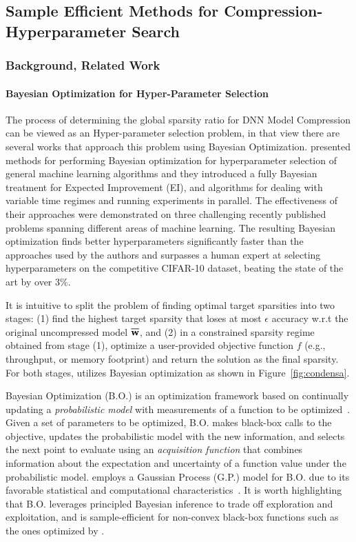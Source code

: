 \subsection{Sample Efficient Methods for Compression-Hyperparameter Search}
\subsubsection{Background, Related Work}

\paragraph{Bayesian Optimization for Hyper-Parameter Selection}
%
The process of determining the global sparsity ratio for DNN Model Compression can be viewed as an Hyper-parameter selection problem, in that view 
there are several works that approach this problem using Bayesian Optimization.
%
\cite{snoek2012practical} presented methods for performing Bayesian optimization for hyperparameter selection of general machine learning algorithms and they introduced a fully Bayesian treatment for Expected Improvement (EI), and algorithms for dealing with variable time regimes and running experiments in parallel. 
%
The effectiveness of their
approaches were demonstrated on three challenging recently published problems spanning different areas of machine learning. 
%
The resulting Bayesian optimization finds better hyperparameters significantly faster than the approaches \cite{cirecsan2012multi} used by the authors and surpasses a human expert at selecting hyperparameters on the competitive CIFAR-10 dataset, beating the state of the art by over $3\%$.

It is intuitive to split the problem of finding optimal target sparsities into two stages: (1) find the highest target sparsity that loses at most $\epsilon$ accuracy w.r.t the original uncompressed model $\overline{{\bf w}}$, and (2) in a constrained sparsity regime obtained from stage (1), optimize a user-provided objective function $f$ (e.g., throughput, or memory footprint) and return the solution as the final sparsity.
For both stages, \algoName utilizes Bayesian optimization as shown in Figure~\ref{fig:condensa}.

Bayesian Optimization (B.O.) is an optimization framework based on continually updating a {\em probabilistic model} with measurements of a function to be optimized~\cite{jones1998efficient}. Given a set of parameters to be optimized, B.O. makes black-box calls to the objective, updates the probabilistic model with the new information, and selects the next point to evaluate using an {\em acquisition function} that combines information about the expectation and uncertainty of a function value under the probabilistic model.
\algoName employs a Gaussian Process (G.P.) model for B.O. due to its favorable statistical and computational characteristics~\cite{srinivas2009gaussian}. 
It is worth highlighting that B.O. leverages principled Bayesian inference to trade off exploration and exploitation, and is sample-efficient for non-convex black-box functions such as the ones optimized by \algoName
\cite{jones1998efficient}.

